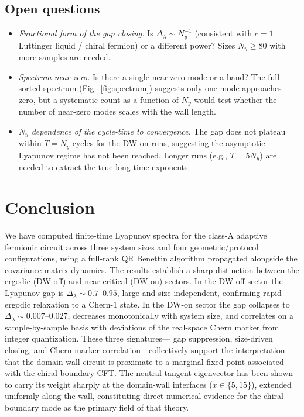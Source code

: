 \documentclass[aps,twocolumn,floatfix,superscriptaddress,nofootinbib]{revtex4-2}
\newcommand{\Dlam}{{\Delta_{\lambda}}}
\begin{document}
\subsection{Open questions}
\label{sec:open}

\begin{itemize}
\item \emph{Functional form of the gap closing.}  Is $\Dlam\sim N_y^{-1}$
  (consistent with $c=1$ Luttinger liquid / chiral fermion) or a different
  power?  Sizes $N_y\geq 80$ with more samples are needed.
\item \emph{Spectrum near zero.}  Is there a single near-zero mode or a band?
  The full sorted spectrum (Fig.~\ref{fig:spectrum}) suggests only one mode
  approaches zero, but a systematic count as a function of $N_y$ would test
  whether the number of near-zero modes scales with the wall length.
\item \emph{$N_y$ dependence of the cycle-time to convergence.}  The gap does
  not plateau within $T=N_y$ cycles for the DW-on runs, suggesting the
  asymptotic Lyapunov regime has not been reached.  Longer runs (e.g., $T=5N_y$)
  are needed to extract the true long-time exponents.
\end{itemize}

\section{Conclusion}
\label{sec:conclusion}

We have computed finite-time Lyapunov spectra for the class-A adaptive
fermionic circuit across three system sizes and four geometric/protocol
configurations, using a full-rank QR Benettin algorithm propagated alongside
the covariance-matrix dynamics.  The results establish a sharp distinction
between the ergodic (DW-off) and near-critical (DW-on) sectors.  In the DW-off
sector the Lyapunov gap is $\Dlam\sim 0.7$--$0.95$, large and size-independent,
confirming rapid ergodic relaxation to a Chern-$1$ state.  In the DW-on sector
the gap collapses to $\Dlam\sim 0.007$--$0.027$, decreases monotonically with
system size, and correlates on a sample-by-sample basis with deviations of the
real-space Chern marker from integer quantization.  These three signatures---
gap suppression, size-driven closing, and Chern-marker correlation---collectively
support the interpretation that the domain-wall circuit is proximate to a
marginal fixed point associated with the chiral boundary CFT.  The neutral tangent eigenvector has been shown to carry its weight sharply at
the domain-wall interfaces ($x\in\{5,15\}$), extended uniformly along the
wall, constituting direct numerical evidence for the chiral boundary mode as
the primary field of that theory.
\end{document}
